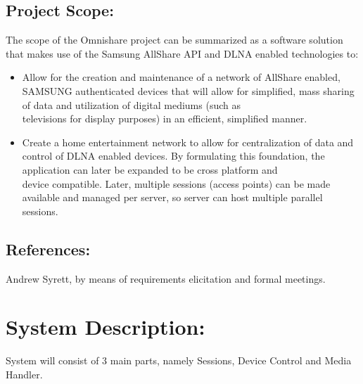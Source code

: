 \documentclass[12pt]{article}
\begin{document}
\subsection{Project Scope:}
The scope of the Omnishare project can be summarized as a software solution that makes use of the Samsung AllShare API and DLNA enabled technologies to:
\begin{itemize}
\item Allow for the creation and maintenance of a network of AllShare enabled, SAMSUNG authenticated devices  that will allow for simplified, mass sharing of data and utilization of digital mediums (such as
\\ televisions for display purposes) in an efficient, simplified manner.
\item  Create a home entertainment network to allow for centralization of data and control of DLNA enabled devices.
By formulating this foundation, the application can later be expanded to be cross platform and 
\\device compatible.  Later, multiple sessions (access points) can be made available and managed per server, so server can host multiple parallel sessions.
\end{itemize}

\subsection{References:}
Andrew Syrett, by means of requirements elicitation and formal meetings.

\section{System Description:}

System will consist of 3 main parts, namely Sessions, Device Control and Media Handler.
\end{document}
